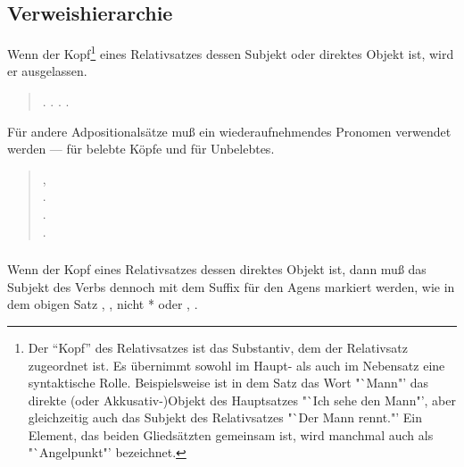 \subsection{Verweishierarchie} Wenn der Kopf\footnote{Der "`Kopf"' des Relativsatzes ist
das Substantiv, dem der Relativsatz zugeordnet ist. Es \"ubernimmt sowohl im Haupt- als
auch im Nebensatz eine syntaktische Rolle. Beispielsweise ist in dem Satz  das Wort "`Mann"’ das direkte (oder Akkusativ-)Objekt des Hauptsatzes
"`Ich sehe den Mann"’, aber gleichzeitig auch das Subjekt des Relativsatzes "`Der Mann
rennt."’ Ein Element, das beiden Glieds\"atzten gemeinsam ist, wird manchmal auch als
"`Angelpunkt"’ bezeichnet.} eines Relativsatzes dessen Subjekt
oder direktes Objekt ist, wird er ausgelassen.

\begin{quotation}
\noindent {}.
  .
\noindent {}.
  .
\end{quotation}
\noindent F\"ur andere Adpositionals\"atze mu\ss{} ein wiederaufnehmendes Pronomen verwendet
werden ---  f\"ur belebte K\"opfe und  f\"ur Unbelebtes.

\begin{quotation}
\noindent {}, \\
\noindent {}.\\
\indent{}.
\noindent {} \\
\indent{}.
\end{quotation}

\subsubsection{} Wenn der Kopf eines Relativsatzes dessen direktes Objekt ist, dann mu\ss{}
das Subjekt des Verbs dennoch mit dem Suffix f\"ur den Agens markiert werden, wie in dem
obigen Satz , , nicht
* oder ,
.

